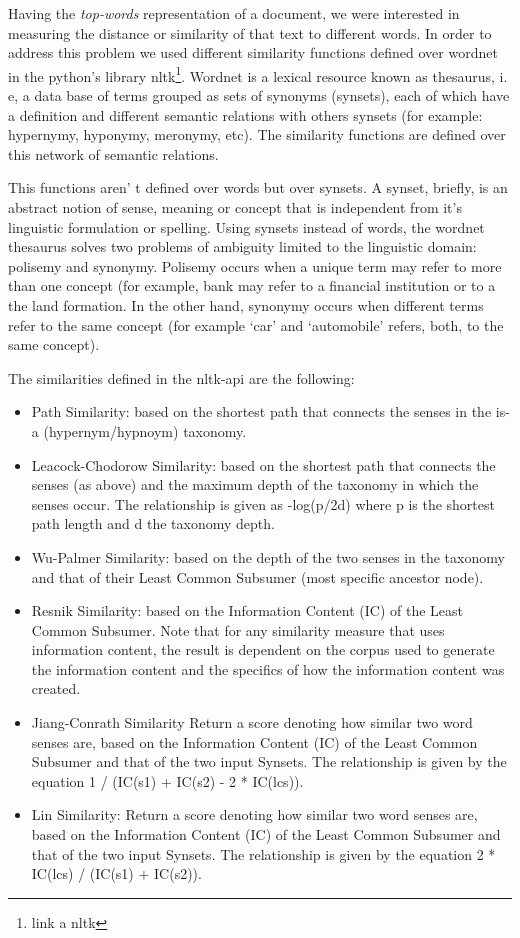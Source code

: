 \documentclass{pnastwo}
\newcommand\sq[1]{\textquoteleft #1\textquoteright}
\begin{document}
\begin{article}
Having the \textit{top-words} representation of a document, we were interested in measuring the distance or similarity of that text to different words. In order to address this problem we used different similarity functions defined over wordnet in the python's library nltk\footnote{link a nltk}. Wordnet is a lexical resource known as thesaurus, i. e, a data base of terms grouped as sets of synonyms (synsets), each of which have a definition and different semantic relations with others synsets (for example: hypernymy, hyponymy, meronymy, etc). The similarity functions are defined over this network of semantic relations.

This functions aren' t defined over words but over synsets. A synset, briefly, is an abstract notion of sense, meaning or concept that is independent from it's linguistic formulation or spelling. Using synsets instead of words, the wordnet thesaurus solves two problems of ambiguity limited to the linguistic domain: polisemy and synonymy. Polisemy occurs when a unique term may refer to more than one concept (for example, bank may refer to a financial institution or to a the land formation. In the other hand, synonymy occurs when different terms refer to the same concept (for example \sq{car} and \sq{automobile} refers, both, to the same concept).

The similarities defined in the nltk-api are the following:

\begin{itemize}
  \item Path Similarity: based on the shortest path that connects the senses in the is-a (hypernym/hypnoym) taxonomy.
  \item Leacock-Chodorow Similarity: based on the shortest path that connects the senses (as above) and the maximum depth of the taxonomy in which the senses occur. The relationship is given as -log(p/2d) where p is the shortest path length and d the taxonomy depth.
  \item Wu-Palmer Similarity: based on the depth of the two senses in the taxonomy and that of their Least Common Subsumer (most specific ancestor node). 
  \item Resnik Similarity: based on the Information Content (IC) of the Least Common Subsumer. Note that for any similarity measure that uses information content, the result is dependent on the corpus used to generate the information content and the specifics of how the information content was created.
  \item Jiang-Conrath Similarity Return a score denoting how similar two word senses are, based on the Information Content (IC) of the Least Common Subsumer and that of the two input Synsets. The relationship is given by the equation 1 / (IC(s1) + IC(s2) - 2 * IC(lcs)).
  \item Lin Similarity: Return a score denoting how similar two word senses are, based on the Information Content (IC) of the Least Common Subsumer and that of the two input Synsets. The relationship is given by the equation 2 * IC(lcs) / (IC(s1) + IC(s2)).
\end{itemize}


\end{article}
\end{document}
